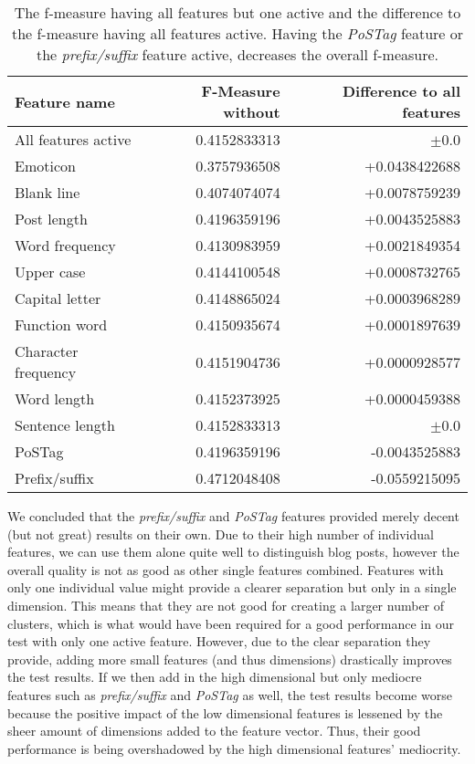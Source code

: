 \begin{table}[ht!]
	\begin{center}
    \begin{tabular}{l|r|r}
	Feature name		& F-Measure without & Difference to all features \\ \hline \hline
	All features active	& 0.4152833313 & $\pm$0.0 \\ \hline \hline
	Emoticon			& 0.3757936508 & +0.0438422688 \\ \hline
	Blank line			& 0.4074074074 & +0.0078759239 \\ \hline
	Post length			& 0.4196359196 & +0.0043525883 \\ \hline
	Word frequency		& 0.4130983959 & +0.0021849354 \\ \hline
	Upper case			& 0.4144100548 & +0.0008732765 \\ \hline
	Capital letter		& 0.4148865024 & +0.0003968289 \\ \hline
	Function word		& 0.4150935674 & +0.0001897639 \\ \hline
	Character frequency	& 0.4151904736 & +0.0000928577 \\ \hline
	Word length			& 0.4152373925 & +0.0000459388 \\ \hline
	Sentence length		& 0.4152833313 & $\pm$0.0 	   \\ \hline
	PoSTag				& 0.4196359196 & -0.0043525883 \\ \hline
	Prefix/suffix		& 0.4712048408 & -0.0559215095 \\
    \end{tabular}
    \end{center}
	\caption{The f-measure having all features but one active and the difference to the f-measure having all features active. Having the \textit{PoSTag} feature or the \textit{prefix/suffix} feature active, decreases the overall f-measure.}
	\label{tab:feature_evaluation_1}
\end{table}

We concluded that the \textit{prefix/suffix} and \textit{PoSTag} features provided merely decent (but not great) results on their own.
Due to their high number of individual features, we can use them alone quite well to distinguish blog posts, however the overall quality is not as good as other single features combined.
Features with only one individual value might provide a clearer separation but only in a single dimension.
This means that they are not good for creating a larger number of clusters, which is what would have been required for a good performance in our test with only one active feature.
However, due to the clear separation they provide, adding more small features (and thus dimensions) drastically improves the test results.
If we then add in the high dimensional but only mediocre features such as \textit{prefix/suffix} and \textit{PoSTag} as well, the test results become worse because the positive impact of the low dimensional features is lessened by the sheer amount of dimensions added to the feature vector.
Thus, their good performance is being overshadowed by the high dimensional features' mediocrity.


